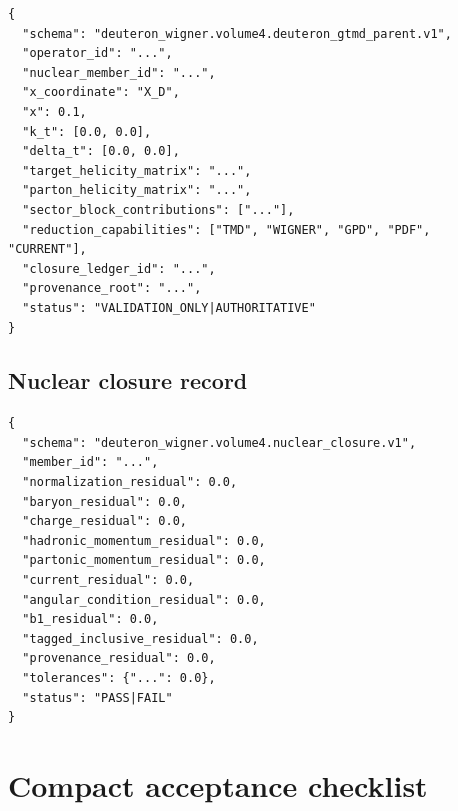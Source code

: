 \documentclass[11pt]{article}
\begin{document}
\begin{verbatim}
{
  "schema": "deuteron_wigner.volume4.deuteron_gtmd_parent.v1",
  "operator_id": "...",
  "nuclear_member_id": "...",
  "x_coordinate": "X_D",
  "x": 0.1,
  "k_t": [0.0, 0.0],
  "delta_t": [0.0, 0.0],
  "target_helicity_matrix": "...",
  "parton_helicity_matrix": "...",
  "sector_block_contributions": ["..."],
  "reduction_capabilities": ["TMD", "WIGNER", "GPD", "PDF", "CURRENT"],
  "closure_ledger_id": "...",
  "provenance_root": "...",
  "status": "VALIDATION_ONLY|AUTHORITATIVE"
}
\end{verbatim}

\subsection{Nuclear closure record}

\begin{verbatim}
{
  "schema": "deuteron_wigner.volume4.nuclear_closure.v1",
  "member_id": "...",
  "normalization_residual": 0.0,
  "baryon_residual": 0.0,
  "charge_residual": 0.0,
  "hadronic_momentum_residual": 0.0,
  "partonic_momentum_residual": 0.0,
  "current_residual": 0.0,
  "angular_condition_residual": 0.0,
  "b1_residual": 0.0,
  "tagged_inclusive_residual": 0.0,
  "provenance_residual": 0.0,
  "tolerances": {"...": 0.0},
  "status": "PASS|FAIL"
}
\end{verbatim}

\section{Compact acceptance checklist}
\label{app:checklist}
\end{document}
